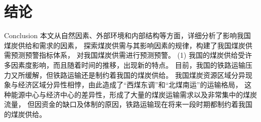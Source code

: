 \chapter{结论}{Conclusion}
本文从自然因素、外部环境和内部结构等方面，详细分析了影响我国煤炭供给和需求的因素，
探索煤炭供需与其影响因素的规律，构建了我国煤炭供需预测预警指标体系，
对我国煤炭供需进行预测预警。
(1) 我国的煤炭供给受许多因素度影响，而且随着时间的推移，出现新的特点。
目前，我国的铁路运输压力又所缓解，但铁路运输还是制约着我国的煤炭供给。
我国煤炭资源区域分异现象与经济区域分异性相悖，由此造成了“西煤东调”和“北煤南运”的运输格局，
这种能源中心与经济中心的差异性，形成了大量的煤炭运输需求以及非常集中的煤炭流量，
但因资金的缺口及体制的原因，铁路运输现在将来一段时期都制约着我国的煤炭供给。

